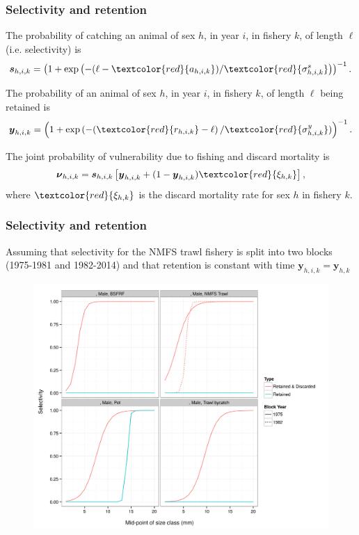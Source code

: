 \documentclass{beamer}
\begin{document}
\begin{frame}
\frametitle{Selectivity and retention}
The probability of catching an animal of sex $h$, in year $i$, in fishery $k$,
of length $\ell$ (i.e. selectivity) is
\begin{equation*}
  \boldsymbol{s}_{h,i,k} = \left(1 + \exp \left(-(\ell - \textcolor{red}{a_{h,i,k}}) /
  \textcolor{red}{\sigma_{h,i,k}^s} \right) \right)^{-1}.
\end{equation*}

The probability of an animal of sex $h$, in year $i$, in fishery $k$, of length
$\ell$ being retained is
\begin{equation*}
  \boldsymbol{y}_{h,i,k} = \left(1 + \exp \left(-(\textcolor{red}{r_{h,i,k}} - \ell \right) /
  \textcolor{red}{\sigma_{h,i,k}^y}) \right)^{-1}.
\end{equation*}

The joint probability of vulnerability due to fishing and discard mortality is
\begin{equation*}
  \boldsymbol\nu_{h,i,k} = \boldsymbol{s}_{h,i,k} \left[ \boldsymbol{y}_{h,i,k} + (1 - \boldsymbol{y}_{h,i,k})
    \textcolor{red}{\xi_{h,k}} \right],
\end{equation*}
where $\textcolor{red}{\xi_{h,k}}$ is the discard mortality rate for sex $h$ in
fishery $k$.
\end{frame}


\begin{frame}
\frametitle{Selectivity and retention}
Assuming that selectivity for the NMFS trawl fishery is split into two blocks
(1975-1981 and 1982-2014) and that retention is constant with time
$\boldsymbol{y}_{h,i,k} = \boldsymbol{y}_{h,k}$
\begin{figure}[!htbp]
  \centering
  \includegraphics[width=0.6\linewidth]{../../examples/bbrkc/OneSex/figure/selectivity.png}
\end{figure}
\end{frame}
\end{document}
